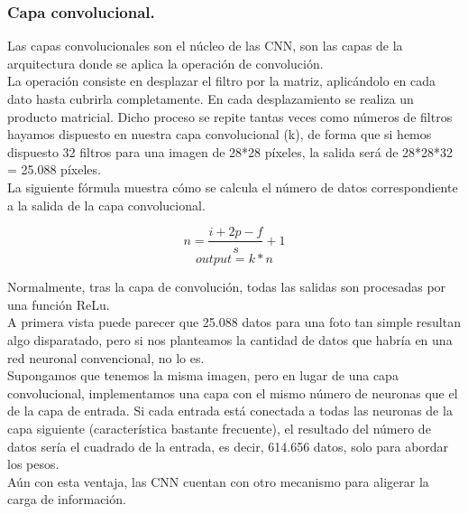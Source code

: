 \documentclass[a4paper,10pt]{article}
\begin{document}
\subsubsection{Capa convolucional.}
Las capas convolucionales son el núcleo de las CNN, son las capas de la arquitectura donde se aplica la operación de convolución. \\La operación consiste en desplazar el filtro por la matriz, aplicándolo en cada dato hasta cubrirla completamente. En cada desplazamiento se realiza un producto matricial. Dicho proceso se repite tantas veces como números de filtros hayamos dispuesto en nuestra capa convolucional (k), de forma que si hemos dispuesto 32 filtros para una imagen de 28*28 píxeles, la salida será de 28*28*32 = 25.088 píxeles.
 \\La siguiente fórmula muestra cómo se calcula el número de datos correspondiente a la salida de la capa convolucional.

\[
n=\frac{i+2p-f}{s}  +1
\]
\[
output = k * n
\]

Normalmente, tras la capa de convolución, todas las salidas son procesadas por una función ReLu.\\
A primera vista puede parecer que 25.088 datos para una foto tan simple resultan algo disparatado, pero si nos planteamos la cantidad de datos que habría en una red neuronal convencional, no lo es. \\
Supongamos que tenemos la misma imagen, pero en lugar de una capa convolucional, implementamos una capa con el mismo número de neuronas que el de la capa de entrada. Si cada entrada está conectada a todas las neuronas de la capa siguiente (característica bastante frecuente), el resultado del número de datos sería el cuadrado de la entrada, es decir, 614.656 datos, solo para abordar los pesos. \\
Aún con esta ventaja, las CNN cuentan con otro mecanismo para aligerar la carga de información.
\end{document}
